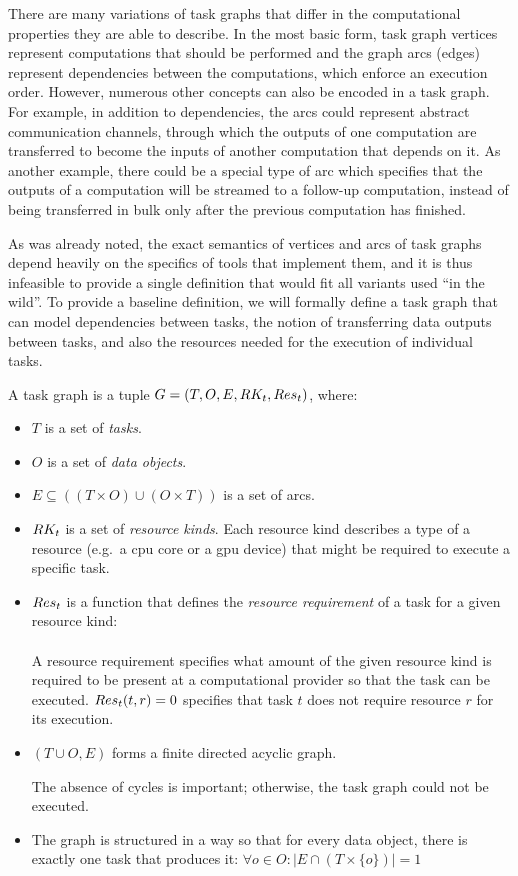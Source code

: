 There are many variations of task graphs that differ in the computational properties they are able
to describe. In the most basic form, task graph vertices represent computations that should be
performed and the graph arcs (edges) represent dependencies between the computations, which enforce
an execution order. However, numerous other concepts can also be encoded in a task graph. For
example, in addition to dependencies, the arcs could represent abstract communication channels,
through which the outputs of one computation are transferred to become the inputs of another
computation that depends on it. As another example, there could be a special type of arc which
specifies that the outputs of a computation will be streamed to a follow-up computation, instead of
being transferred in bulk only after the previous computation has finished.

As was already noted, the exact semantics of vertices and arcs of task graphs depend heavily on the
specifics of tools that implement them, and it is thus infeasible to provide a single definition
that would fit all variants used ``in the wild''. To provide a baseline definition, we will
formally define a task graph that can model dependencies between tasks, the notion of transferring
data outputs between tasks, and also the resources needed for the execution of individual tasks.

\newcommand{\alltaskpairs}{\forall t_1\in{}T, \forall t_2\in{}T}

\vspace{2mm} A task graph is a tuple $G = (T, O, E, RK_t, Res_t)$, where:
\begin{itemize}[itemsep=0pt]
	\item $T$ is a set of \emph{tasks}.
	\item $O$ is a set of \emph{data objects}.
	\item $E \subseteq ((T\times{}O) \cup (O\times{}T))$ is a set of arcs.
	\item $RK_t$ is a set of \emph{resource kinds}. Each resource kind
	      describes a type of a resource (e.g.\ a \gls{cpu} core or a \gls{gpu} device)
	      that might be required to execute a specific task.
	\item $Res_t$ is a function that defines the
	      \emph{resource requirement} of a task for a given resource kind: \\
	       \\
	      A resource requirement specifies what amount of the given resource kind is required to be present
	      at a computational provider so that the task can be executed. $Res_t(t, r) = 0$ specifies that
	      task $t$ does not require resource $r$ for its execution.
	\item $(T \cup O, E)$ forms a finite directed acyclic graph.

		  The absence of cycles is important; otherwise, the task graph could not be executed.
	\item The graph is structured in a way so that for every data
	object, there is exactly one task that produces it: $\forall o \in O: |E \cap (T \times \{o\})| = 1$
\end{itemize}

